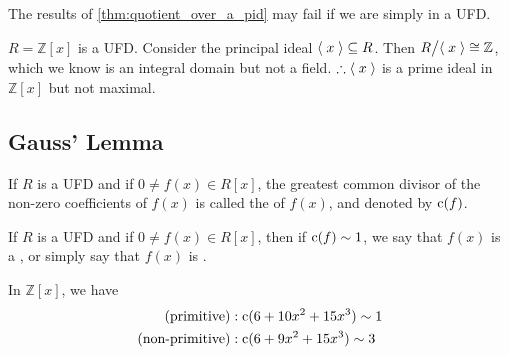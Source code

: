\begin{note}
  The results of \cref{thm:quotient_over_a_pid} may fail if we are simply in a UFD.
\end{note}

\begin{eg}
  $R = \mathbb{Z}[x]$ is a UFD. Consider the principal ideal $\langle \; x \; \rangle \subseteq R$. Then $R \big/ \langle \; x \; \rangle \cong \mathbb{Z}$, which we know is an integral domain but not a field. $\therefore \langle \; x \; \rangle$ is a prime ideal in $\mathbb{Z}[x]$ but not maximal.
\end{eg}


\subsection{Gauss' Lemma}%
\label{sub:gauss_lemma}

\begin{defn}[Content]
\label{defn:content}
If $R$ is a UFD and if $0 \neq f(x) \in R[x]$, the greatest common divisor of the non-zero coefficients of $f(x)$ is called the  of $f(x)$, and denoted by $\operatorname{c}(f)$.
\end{defn}

\begin{defn}
\label{defn:primitive_polynomials}
If $R$ is a UFD and if $0 \neq f(x) \in R[x]$, then if $\operatorname{c}(f) \sim 1$, we say that $f(x)$ is a , or simply say that $f(x)$ is .
\end{defn}

\begin{eg}
  In $\mathbb{Z}[x]$, we have
  \begin{align*}
    \text{(primitive)} &: \operatorname{c}( 6 + 10x^2 + 15x^3 ) \sim 1 \\
    \text{(non-primitive)} &: \operatorname{c}( 6 + 9x^2 + 15x^3 ) \sim 3
  \end{align*}
\end{eg}



